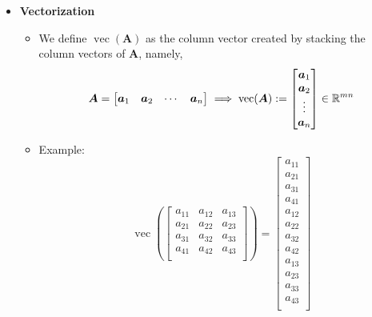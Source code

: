\documentclass[12pt,a4paper]{article}
\DeclareMathOperator{\vect}{vec}
\begin{document}
\begin{itemize}
\item \textbf{Vectorization}
  
  \begin{itemize}

  \item We define $\vect(\bm{A})$ as the column vector created by stacking the column vectors of $\bm{A}$,
    namely,
    \begin{equation}\nonumber%
      \bm{A} =
      \begin{bmatrix}
        \bm{a}_{1} & \bm{a}_{2} & \cdots & \bm{a}_{n}
      \end{bmatrix}
      \implies 
      \vect(\bm{A}) :=
      \begin{bmatrix}
        \bm{a}_{1}\\
        \bm{a}_{2}\\
        \vdots\\
        \bm{a}_{n}\\
      \end{bmatrix}
      \in \R^{mn}
    \end{equation}
  \item Example:
    \begin{equation}\nonumber%
      \vect
      \left(
      \begin{bmatrix}
        a_{11} & a_{12} & a_{13} \\
        a_{21} & a_{22} & a_{23} \\
        a_{31} & a_{32} & a_{33} \\
        a_{41} & a_{42} & a_{43} \\
      \end{bmatrix}
    \right)
    = 
      \begin{bmatrix}
        a_{11} \\
        a_{21} \\
        a_{31} \\
        a_{41} \\
        a_{12} \\
        a_{22} \\
        a_{32} \\
        a_{42} \\
        a_{13} \\
        a_{23} \\
        a_{33} \\
        a_{43} \\
      \end{bmatrix}

\end{equation}
\end{itemize}
\end{itemize}
\end{document}
